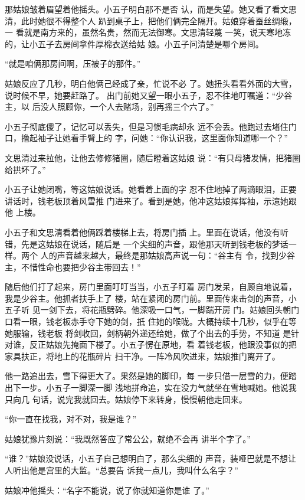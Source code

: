 那姑娘皱着眉望着他摇头。小五子明白那不是否
认，而是失望。她又看了看文思清，此时她很不得整个人
趴到桌子上，把他们俩完全隔开。姑娘穿着蚕丝绸缎，一
看就是南方来的，虽然名贵，然而无法御寒。文思清轻蔑
一笑，说天寒地冻的，让小五子去房间拿件厚棉衣送给姑
娘。小五子问清楚是哪个房间。

“就是咱俩那房间啊，压被子的那件。”

姑娘反应了几秒，明白他俩己经成了亲，忙说不必
了。她扭头看看外面的大雪，说时候不早，她要赶路了。
出门前她又望一眼小五子，忍不往地叮嘱道：“少谷主，以
后没人照顾你，一个人去赌场，别再摇三个六了。”

小五子彻底傻了，记忆可以丢失，但是习惯毛病却永
远不会丢。他跑过去堵住门口，撸起袖子让她看手臂上的
字，问她：“你认识我，这里面你知道哪一个？”

文思清过来拉他，让他去修修猪圈，随后瞪着这姑娘
说：“有只母猪发情，把猪圈给拱坏了。”

小五子让她闭嘴，等这姑娘说话。她看着上面的字
忍不住地掉了两滴眼泪，正要讲话时，钱老板顶着风雪推
门进来了。看到是她，他冲这姑娘挥挥袖，示澺她跟他
上楼。

小五子和文思清看着他俩踩着楼梯上去，将房门插
上。里面在说话，他没有听错，先是这姑娘在说话，随后是
一个尖细的声音，跟他那天听到钱老板的梦话一样。两个
人的声音越来越大，最终是那姑娘高声说一句：“谷主有
令，找到少谷主，不惜性命也要把少谷主带回去！”

随后他们打了起来，房门里面叮叮当当，小五子盯着
房门发呆，自顾自地说着，我是少谷主。他抓者扶手上了
楼，站在紧闭的房门前。里面传来击剑的声音，小五子听
见一剑下去，将花瓶劈碎。他深吸一口气，一脚踹开房
门。姑娘回头朝门口看一眼，钱老板赤手夺下她的剑，扺
住她的喉咙。大概持续十几秒，似乎在等她服输，钱老板
将剑收回，剑柄朝外递还给她，做了个出去的手势，不知道
是针对谁，反正姑娘先掩面下楼了。小五子愣在原地，看
着钱老板，他跟没事似的把家具扶正，将地上的花瓶碎片
扫干净。一阵冷风吹进来，姑娘推门离开了。

他一路追出去，雪下得更大了。果然是她的脚印，每
一步只借一层雪的力，便踏出下一步。小五子一脚深一脚
浅地拼命追，实在没力气就坐在雪地喊她。他说我只向几
句话，说完我就回去。姑娘停下来转身，慢慢朝他走回来。

“你一直在找我，对不对，我是谁？”

姑娘犹豫片刻说：“我既然答应了常公公，就绝不会再
讲半个字了。”

“谁？”姑娘没说话，小五子自己想明白了，那么尖细的
声音，装哑巴就是不想让人听出他是宫里的大监。“总要告
诉我一点儿，我叫什么名字？”

姑娘冲他摇头：“名字不能说，说了你就知道你是谁
了。”

